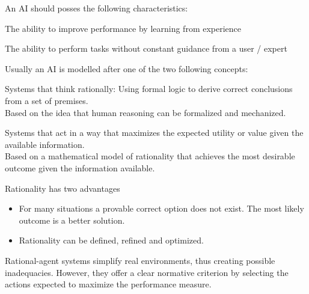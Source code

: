 \documentclass[
../EiKI_Summary.tex,
]
{subfiles}
\begin{document}
An AI should posses the following characteristics:

\begin{minipage}
    [t]{0.5\textwidth}
    \centering
    \begin{defbox}
        [Adaptability]
        The ability to improve performance by learning from experience
    \end{defbox}
\end{minipage}
\begin{minipage}
    [t]{0.5\textwidth}
    \centering
    \begin{defbox}
        [Autonomous]
        The ability to perform tasks without constant guidance from a user / expert
    \end{defbox}
\end{minipage}

Usually an AI is modelled after one of the two following concepts:

\begin{minipage}
    [t]{0.5\textwidth}
    \centering
    \begin{defbox}
        Systems that think rationally: Using formal logic to derive correct conclusions from a set of premises.\\
        Based on the idea that human reasoning can be formalized and mechanized.
    \end{defbox}
\end{minipage}
\begin{minipage}
    [t]{0.5\textwidth}
    \centering
    \begin{defbox}
        Systems that act in a way that maximizes the expected utility or value given the available information.\\
        Based on a mathematical model of rationality that achieves the most desirable outcome given the information available.
    \end{defbox}
\end{minipage}


Rationality has two advantages
\begin{itemize}
    \item {} For many situations a provable correct option does not exist. The most likely outcome is a better solution.
    \item {} Rationality can be defined, refined and optimized.
\end{itemize}
Rational-agent systems simplify real environments, thus creating possible inadequacies. However, they offer a clear normative criterion by selecting the actions expected to maximize the performance measure.
\end{document}

